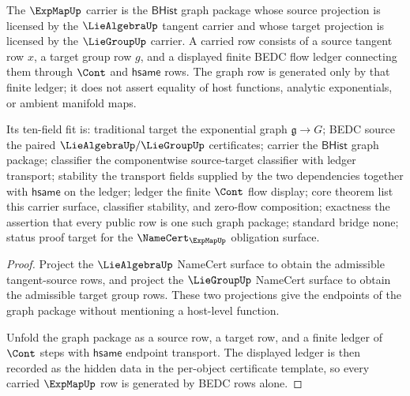\begin{theorem}
\label{thm:expmap-carrier-obligation-surface}
The $\ExpMapUp$ carrier is the $\mathsf{BHist}$ graph package whose source projection is licensed by the $\LieAlgebraUp$ tangent carrier and whose target projection is licensed by the $\LieGroupUp$ carrier. A carried row consists of a source tangent row $x$, a target group row $g$, and a displayed finite BEDC flow ledger connecting them through $\Cont$ and $\mathsf{hsame}$ rows. The graph row is generated only by that finite ledger; it does not assert equality of host functions, analytic exponentials, or ambient manifold maps.

Its ten-field fit is: traditional target the exponential graph $\mathfrak{g}\to G$; BEDC source the paired $\LieAlgebraUp/\LieGroupUp$ certificates; carrier the $\mathsf{BHist}$ graph package; classifier the componentwise source-target classifier with ledger transport; stability the transport fields supplied by the two dependencies together with $\mathsf{hsame}$ on the ledger; ledger the finite $\Cont$ flow display; core theorem list this carrier surface, classifier stability, and zero-flow composition; exactness the assertion that every public row is one such graph package; standard bridge none; status proof target for the $\NameCert_{\ExpMapUp}$ obligation surface.
\end{theorem}
\begin{proof}
Project the $\LieAlgebraUp$ NameCert surface to obtain the admissible tangent-source rows, and project the $\LieGroupUp$ NameCert surface to obtain the admissible target group rows. These two projections give the endpoints of the graph package without mentioning a host-level function.

Unfold the graph package as a source row, a target row, and a finite ledger of $\Cont$ steps with $\mathsf{hsame}$ endpoint transport. The displayed ledger is then recorded as the hidden data in the per-object certificate template, so every carried $\ExpMapUp$ row is generated by BEDC rows alone.
\end{proof}

